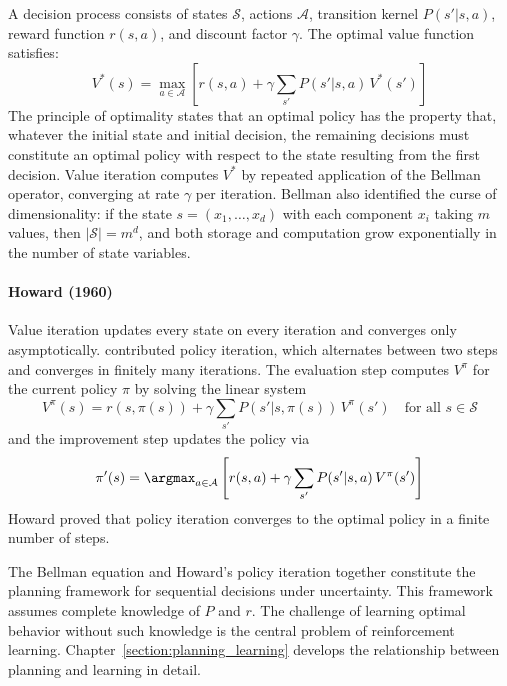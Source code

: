 A decision process consists of states $\mathcal{S}$, actions $\mathcal{A}$, transition kernel $P(s'|s,a)$, reward function $r(s,a)$, and discount factor $\gamma$. The optimal value function satisfies:
\begin{equation}
V^*(s) = \max_{a \in \mathcal{A}} \left[ r(s,a) + \gamma \sum_{s'} P(s'|s,a) \, V^*(s') \right]
\label{eq:bellman}
\end{equation}
The principle of optimality states that an optimal policy has the property that, whatever the initial state and initial decision, the remaining decisions must constitute an optimal policy with respect to the state resulting from the first decision. Value iteration computes $V^*$ by repeated application of the Bellman operator, converging at rate $\gamma$ per iteration. Bellman also identified the curse of dimensionality: if the state $s = (x_1, \ldots, x_d)$ with each component $x_i$ taking $m$ values, then $|\mathcal{S}| = m^d$, and both storage and computation grow exponentially in the number of state variables.

\paragraph{Howard (1960)}

Value iteration updates every state on every iteration and converges only asymptotically. \citet{howard1960} contributed policy iteration, which alternates between two steps and converges in finitely many iterations. The evaluation step computes $V^\pi$ for the current policy $\pi$ by solving the linear system
\begin{equation}
V^\pi(s) = r(s, \pi(s)) + \gamma \sum_{s'} P(s'|s, \pi(s)) \, V^\pi(s') \quad \text{for all } s \in \mathcal{S}
\end{equation}
and the improvement step updates the policy via
\begin{equation}
\pi'(s) = \argmax_{a \in \mathcal{A}} \left[ r(s,a) + \gamma \sum_{s'} P(s'|s,a) \, V^\pi(s') \right]
\end{equation}
Howard proved that policy iteration converges to the optimal policy in a finite number of steps.

The Bellman equation and Howard's policy iteration together constitute the planning framework for sequential decisions under uncertainty. This framework assumes complete knowledge of $P$ and $r$. The challenge of learning optimal behavior without such knowledge is the central problem of reinforcement learning. Chapter~\ref{section:planning_learning} develops the relationship between planning and learning in detail.

